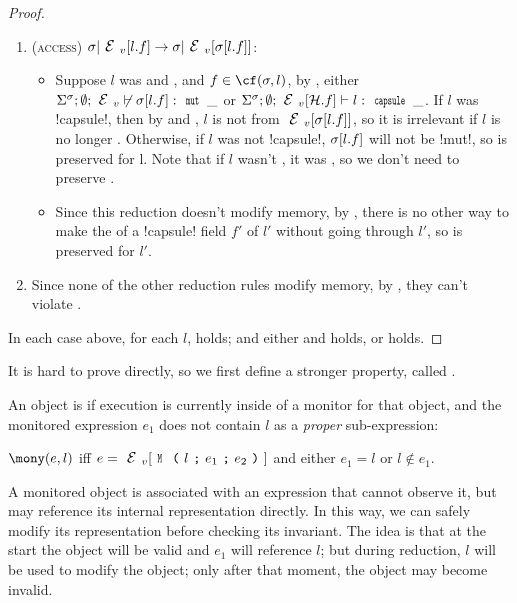 \begin{proof}
\begin{ienumerate}
\begin{enumerate}
		
		\item (\textsc{access}) $\s|\EV[l.f]\rightarrow \s|\EV[\s[l.f]]$:
		\begin{itemize}
			\item Suppose $l$ was \WE and \NCM, and $f \in \cf(\s, l)$, by , either $\Ss; \emptyset; \EV \nvdash \s[l.f] : \Kw{mut}\,\_$ or $\Ss; \emptyset; \EV[\h.f] \vdash l : \Kw{capsule}\,\_$. If $l$ was \Q!capsule!, then by  and \HNC, $l$ is not \reach from $\EV[\s[l.f]]$, so it is irrelevant if $l$ is no longer \WE. Otherwise, if $l$ was not \Q!capsule!, $\sigma[l.f]$ will not be \Q!mut!, so \WE is preserved for l. Note that if $l$ wasn't \NCM, it was \HNO, so we don't need to preserve \WE. 
			\item Since this reduction doesn't modify memory, by , there is no other way to make the \rog of a \Q!capsule! field $f'$ of $l'$ \muty without going through $l'$, so \WE is preserved for $l'$.
		\end{itemize}
		
		\item Since none of the other reduction rules modify memory, by , they can't violate \WE.	
	\end{enumerate}
\end{ienumerate}

\noindent In each case above, for each $l$, \HNC holds; and either \WE and \NCM holds, or \HNO holds.
\end{proof}

It is hard to prove  directly,
so we first define a stronger property,
called .

An object is \mony if execution
is currently inside of a monitor for that object, and
the monitored expression $e_1$ does not
contain $l$ as a \emph{proper} sub-expression:

\indent $\mony(e,l)$ iff
$e=\EV[\M{l}{e_1}{e_2}]$ and either $e_1=l$ or $l \notin e_1$.%

\noindent A monitored object is associated with an expression that cannot observe it, but may
reference its internal representation directly.
In this way, we can safely modify its representation before checking its invariant.
The idea is that at the start the object will be valid and $e_1$ will reference $l$;
but during reduction, $l$ will be used to
modify the object; only after that moment, the object may become invalid.

